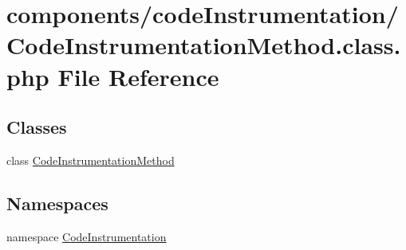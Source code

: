 \hypertarget{_code_instrumentation_method_8class_8php}{
\section{components/codeInstrumentation/CodeInstrumentationMethod.class.php File Reference}
\label{_code_instrumentation_method_8class_8php}
}
\subsection*{Classes}
\begin{CompactItemize}
\item 
class \hyperlink{class_code_instrumentation_method}{CodeInstrumentationMethod}
\end{CompactItemize}
\subsection*{Namespaces}
\begin{CompactItemize}
\item 
namespace \hyperlink{namespace_code_instrumentation}{CodeInstrumentation}
\end{CompactItemize}
